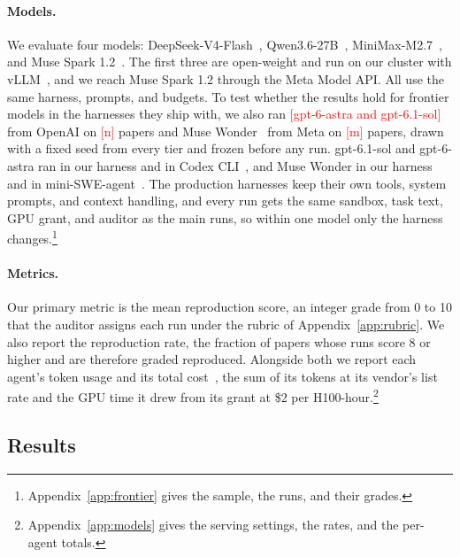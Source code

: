 \documentclass{article} %
\newcommand{\todo}[1]{\textcolor{red}{[#1]}}
\begin{document}
\paragraph{Models.} We evaluate four models:
DeepSeek-V4-Flash~\citep{deepseekai2026deepseekv4highlyefficientmilliontoken,deepseekai2026flashcard},
Qwen3.6-27B~\citep{qwen3.6-27b}, MiniMax-M2.7~\citep{minimax2026m2}, and
Muse Spark 1.2~\citep{meta2026musespark}. The first three are open-weight and
run on our cluster with vLLM~\citep{kwon2023vllm}, and we reach Muse Spark 1.2 through the Meta
Model API. All use the same harness, prompts, and budgets. To test whether the
results hold for frontier models in the harnesses they ship with, we also ran
\todo{gpt-6-astra and gpt-6.1-sol}~\citep{openai2026gpt6astra,openai2026gpt61sol} from OpenAI on \todo{n} papers and
Muse Wonder~\citep{meta2026musewonder} from Meta on \todo{m} papers, drawn with a fixed seed from
every tier and frozen before any run. gpt-6.1-sol and gpt-6-astra ran in our
harness and in Codex CLI~\citep{openai2026codexcli}, and Muse Wonder in our
harness and in mini-SWE-agent~\citep{yang2024sweagent}. The production
harnesses keep their own tools, system prompts, and context handling, and every
run gets the same sandbox, task text, GPU grant, and auditor as the main runs,
so within one model only the harness changes.\footnote{Appendix~\ref{app:frontier}
gives the sample, the runs, and their grades.}

\paragraph{Metrics.} Our primary metric is the mean reproduction score, an
integer grade from 0 to 10 that the auditor assigns each run
under the rubric of Appendix~\ref{app:rubric}. We also report the
reproduction rate, the fraction of papers whose runs score 8 or higher and
are therefore graded reproduced. Alongside both we report each agent's token
usage and its total cost~\citep{kapoor2024agents,kapoor2026hal}, the sum of its tokens at its
vendor's list rate and the GPU time it drew from its grant at \$2 per
H100-hour.\footnote{Appendix~\ref{app:models} gives the serving settings, the
rates, and the per-agent totals.}

\subsection{Results}
\label{subsec:results}
\end{document}
